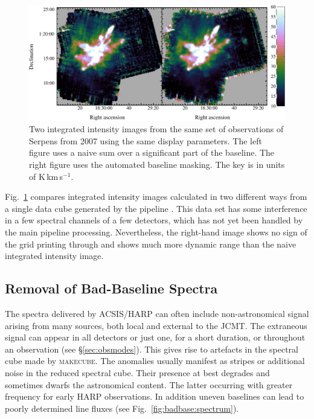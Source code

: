 \documentclass[useAMS,usenatbib]{mn2e}
\newcommand{\makecube}{\textsc{makecube}}
\begin{document}
\begin{figure}
\centering
\includegraphics[width=\textwidth]{integ_manual_auto}
\caption{Two integrated intensity images from the same set of
  observations of Serpens from 2007 using the same display
  parameters. The left figure uses a naive sum over a significant part
  of the baseline. The right figure uses the automated baseline
  masking. The key is in units of K\,km\,s$^{-1}$.}
\label{fig:integ}
\end{figure}

Fig.\ \ref{fig:integ} compares integrated intensity images calculated
in two different ways from a single data cube generated by the
pipeline \citep[see][for details of earlier
reductions of these data]{2010MNRAS.409.1412G,2010A&A...523A..29D}. This data set
has some interference in a few spectral channels of a few detectors,
which has not yet been handled by the main pipeline
processing. Nevertheless, the right-hand image shows no sign of the grid
printing through and shows much more dynamic range than the naive
integrated intensity image.

\subsection{Removal of Bad-Baseline Spectra}


The spectra delivered by ACSIS/HARP can often include non-astronomical
signal arising from many sources, both local and external to the  JCMT. The
extraneous signal can appear in all detectors or just one, for a short
duration, or throughout an observation (see \S\ref{sec:obsmodes}).
This gives rise to artefacts in the spectral cube made by \makecube.  The anomalies
usually manifest as stripes or additional noise in the reduced
spectral cube.  Their presence at best degrades and sometimes dwarfs
the astronomical content.  The latter occurring with greater frequency
for early HARP observations.  In addition uneven baselines can lead
to poorly determined line fluxes (see Fig.~\ref{fig:badbase:spectrum}).
\end{document}
